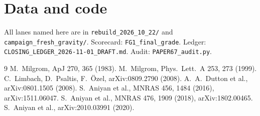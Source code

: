 \documentclass[10pt]{article}
\begin{document}
\section*{Data and code}
All lanes named here are in \texttt{rebuild\_2026\_10\_22/} and \texttt{campaign\_fresh\_gravity/}. Scorecard: \texttt{FG1\_final\_grade}. Ledger: \texttt{CLOSING\_LEDGER\_2026-11-01\_DRAFT.md}. Audit: \texttt{PAPER67\_audit.py}.

\begin{thebibliography}{9}\small
{} M.~Milgrom, ApJ 270, 365 (1983).
 M.~Milgrom, Phys.\ Lett.\ A 253, 273 (1999).
 C.~Limbach, D.~Psaltis, F.~\"Ozel, arXiv:0809.2790 (2008).
 A.~A.~Dutton et al., arXiv:0801.1505 (2008).
 S.~Aniyan et al., MNRAS 456, 1484 (2016), arXiv:1511.06047.
 S.~Aniyan et al., MNRAS 476, 1909 (2018), arXiv:1802.00465.
 S.~Aniyan et al., arXiv:2010.03991 (2020).
\end{thebibliography}
\end{document}
